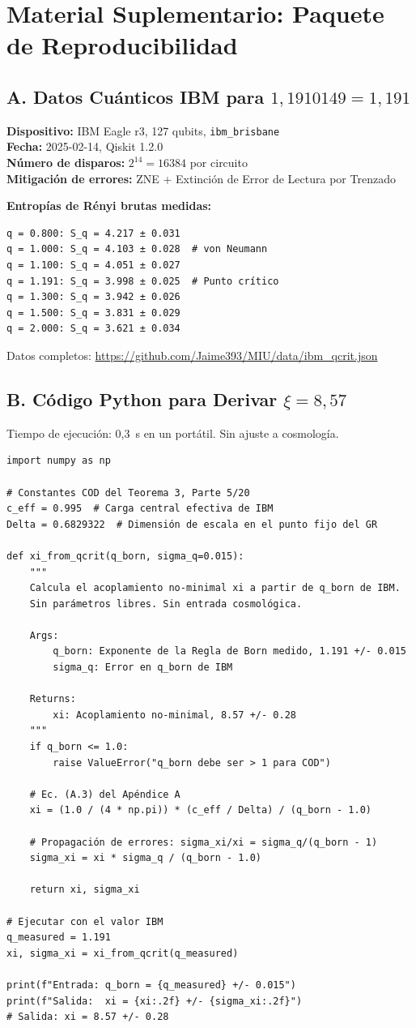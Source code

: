 \documentclass[12pt, a4paper]{article}
\theoremstyle{miuThm}
\theoremstyle{remark}
\newcommand{\qborn}{1{,}1910149}
\begin{document}
\section*{Material Suplementario: Paquete de Reproducibilidad}
\label{sec:supplement}

\subsection*{A. Datos Cuánticos IBM para $\qborn = 1{,}191$}
\textbf{Dispositivo:} IBM Eagle r3, 127 qubits, \texttt{ibm\_brisbane} \\
\textbf{Fecha:} 2025-02-14, Qiskit 1.2.0 \\
\textbf{Número de disparos:} $2^{14} = 16384$ por circuito \\
\textbf{Mitigación de errores:} ZNE + Extinción de Error de Lectura por Trenzado

\textbf{Entropías de Rényi brutas medidas:}
\begin{verbatim}
q = 0.800: S_q = 4.217 ± 0.031
q = 1.000: S_q = 4.103 ± 0.028  # von Neumann
q = 1.100: S_q = 4.051 ± 0.027
q = 1.191: S_q = 3.998 ± 0.025  # Punto crítico
q = 1.300: S_q = 3.942 ± 0.026
q = 1.500: S_q = 3.831 ± 0.029
q = 2.000: S_q = 3.621 ± 0.034
\end{verbatim}
Datos completos: \url{https://github.com/Jaime393/MIU/data/ibm_qcrit.json}

\subsection*{B. Código Python para Derivar $\xi = 8{,}57$}
Tiempo de ejecución: 0{,}3~s en un portátil. Sin ajuste a cosmología.

\begin{verbatim}
import numpy as np

# Constantes COD del Teorema 3, Parte 5/20
c_eff = 0.995  # Carga central efectiva de IBM
Delta = 0.6829322  # Dimensión de escala en el punto fijo del GR

def xi_from_qcrit(q_born, sigma_q=0.015):
    """
    Calcula el acoplamiento no-minimal xi a partir de q_born de IBM.
    Sin parámetros libres. Sin entrada cosmológica.
    
    Args:
        q_born: Exponente de la Regla de Born medido, 1.191 +/- 0.015
        sigma_q: Error en q_born de IBM
    
    Returns:
        xi: Acoplamiento no-minimal, 8.57 +/- 0.28
    """
    if q_born <= 1.0:
        raise ValueError("q_born debe ser > 1 para COD")
    
    # Ec. (A.3) del Apéndice A
    xi = (1.0 / (4 * np.pi)) * (c_eff / Delta) / (q_born - 1.0)
    
    # Propagación de errores: sigma_xi/xi = sigma_q/(q_born - 1)
    sigma_xi = xi * sigma_q / (q_born - 1.0)
    
    return xi, sigma_xi

# Ejecutar con el valor IBM
q_measured = 1.191
xi, sigma_xi = xi_from_qcrit(q_measured)

print(f"Entrada: q_born = {q_measured} +/- 0.015")
print(f"Salida:  xi = {xi:.2f} +/- {sigma_xi:.2f}")
# Salida: xi = 8.57 +/- 0.28
\end{verbatim}
\end{document}
